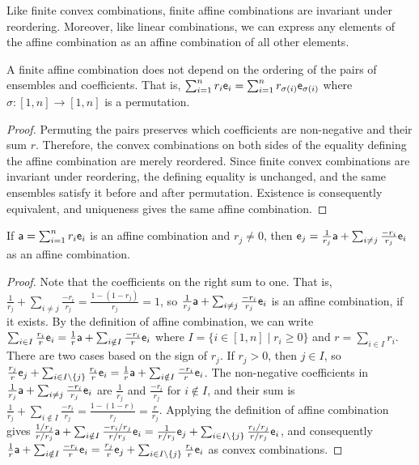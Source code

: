 Like finite convex combinations, finite affine combinations are invariant under reordering. Moreover, like linear combinations, we can express any elements of the affine combination as an affine combination of all other elements.

\begin{mathSection}
\begin{coro}
	A finite affine combination does not depend on the ordering of the pairs of ensembles and coefficients. That is, $\sum_{i=1}^{n} r_i \ens_i =\sum_{i=1}^{n} r_{\sigma(i)} \ens_{\sigma(i)}$ where $\sigma : [1,n] \to [1,n]$ is a permutation.
\end{coro}

\begin{proof}
	Permuting the pairs preserves which coefficients are non-negative and their sum $r$. Therefore, the convex combinations on both sides of the equality defining the affine combination are merely reordered. Since finite convex combinations are invariant under reordering, the defining equality is unchanged, and the same ensembles satisfy it before and after permutation. Existence is consequently equivalent, and uniqueness gives the same affine combination.
\end{proof}
	
\begin{prop}
	If $\ens[a] = \sum_{i=1}^n r_i\ens[e]_i$ is an affine combination and $r_j \ne 0$, then $\ens[e]_j = \frac{1}{r_j}\ens[a] + \sum_{i \ne j} \frac{-r_i}{r_j}\ens[e]_i$ as an affine combination.
\end{prop}

\begin{proof}
	Note that the coefficients on the right sum to one. That is, $\frac{1}{r_j} + \sum_{i \ne j} \frac{-r_i}{r_j} = \frac{1 - (1 - r_j)}{r_j} = 1$, so $\frac{1}{r_j}\ens[a] + \sum_{i \ne j} \frac{-r_i}{r_j}\ens[e]_i$ is an affine combination, if it exists. By the definition of affine combination, we can write $\sum_{i \in I}\frac{r_i}{r}\ens[e]_i = \frac{1}{r}\ens[a] + \sum_{i \notin I}\frac{-r_i}{r}\ens[e]_i$ where $I = \{i \in [1,n] \mid r_i \ge 0\}$ and $r = \sum_{i \in I} r_i$. There are two cases based on the sign of $r_j$. If $r_j > 0$, then $j \in I$, so $\frac{r_j}{r}\ens[e]_j + \sum_{i \in I \setminus \{j\}}\frac{r_i}{r}\ens[e]_i = \frac{1}{r}\ens[a] + \sum_{i \notin I}\frac{-r_i}{r}\ens[e]_i$. The non-negative coefficients in $\frac{1}{r_j}\ens[a] + \sum_{i \ne j} \frac{-r_i}{r_j}\ens[e]_i$ are $\frac{1}{r_j}$ and $\frac{-r_i}{r_j}$ for $i \notin I$, and their sum is $\frac{1}{r_j} + \sum_{i \notin I} \frac{-r_i}{r_j} = \frac{1 - (1 - r)}{r_j} = \frac{r}{r_j}$. Applying the definition of affine combination gives $\frac{1 / r_j}{r / r_j}\ens[a] + \sum_{i \notin I} \frac{-r_i / r_j}{r / r_j}\ens[e]_i = \frac{1}{r / r_j}\ens[e]_j + \sum_{i \in I \setminus \{j\}} \frac{r_i / r_j}{r / r_j}\ens[e]_i$, and consequently $\frac{1}{r}\ens[a] + \sum_{i \notin I} \frac{-r_i}{r}\ens[e]_i = \frac{r_j}{r}\ens[e]_j + \sum_{i \in I \setminus \{j\}} \frac{r_i}{r}\ens[e]_i$ as convex combinations.
	

\end{proof}
\end{mathSection}
